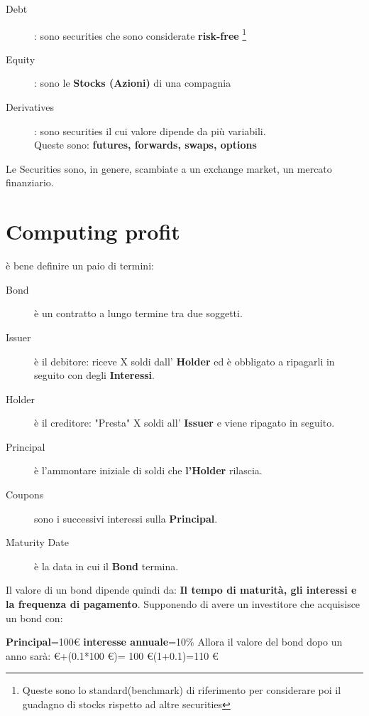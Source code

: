\documentclass[a4paper,11pt]{report}
\begin{document}
{\begin{description}
\item[Debt]: sono securities che sono considerate \textbf{risk-free} \footnote{Queste sono lo standard(benchmark) di riferimento per considerare poi il guadagno di stocks rispetto ad altre securities}
\item[Equity]: sono le \textbf{Stocks (Azioni)} di una compagnia
\item[Derivatives]: sono securities il cui valore dipende da più variabili. \\ Queste sono: \bfseries {futures, forwards, swaps, options}
\end{description}
Le Securities sono, in genere, scambiate a un exchange market, un mercato finanziario. \newpage

\section{Computing profit}
è bene definire un paio di termini:
\begin {description}
\item[Bond] è un contratto a lungo termine tra due soggetti.
\item[Issuer] è il debitore: riceve X soldi dall' {\bfseries Holder} ed è obbligato a ripagarli in seguito con degli {\bfseries Interessi}.
\item[Holder] è il creditore: "Presta" X soldi all' {\bfseries Issuer} e viene ripagato in seguito.
\item[Principal] è l'ammontare iniziale di soldi che {\bfseries l'Holder} rilascia.
\item[Coupons] sono i successivi interessi sulla {\bfseries Principal}.
\item[Maturity Date] è la data in cui il {\bfseries Bond} termina.
\end {description}
Il valore di un bond dipende quindi da:  {\bfseries Il tempo di maturità, gli interessi e la frequenza di pagamento}. \newline
Supponendo di avere un investitore che acquisisce un bond con: 
\begin{center}
\textbf{Principal}=100\euro \newline
\textbf{interesse annuale}=10\% \newline
Allora il valore del bond dopo un anno sarà: \euro+(0.1*100 \euro)= 100 \euro *(1+0.1)=110 \euro
\end{center}
\newpage

}
\end{document}
